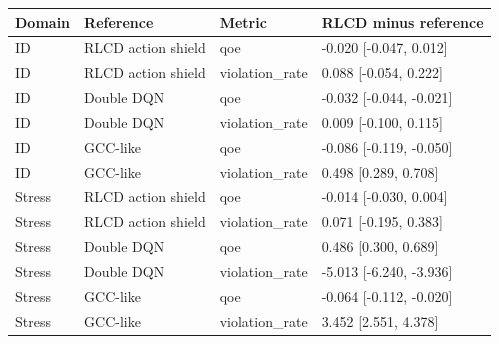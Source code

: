 \begin{tabular}{llll}
\toprule
Domain & Reference & Metric & RLCD minus reference \\
\midrule
ID & RLCD action shield & qoe & -0.020 [-0.047, 0.012] \\
ID & RLCD action shield & violation\_rate & 0.088 [-0.054, 0.222] \\
ID & Double DQN & qoe & -0.032 [-0.044, -0.021] \\
ID & Double DQN & violation\_rate & 0.009 [-0.100, 0.115] \\
ID & GCC-like & qoe & -0.086 [-0.119, -0.050] \\
ID & GCC-like & violation\_rate & 0.498 [0.289, 0.708] \\
Stress & RLCD action shield & qoe & -0.014 [-0.030, 0.004] \\
Stress & RLCD action shield & violation\_rate & 0.071 [-0.195, 0.383] \\
Stress & Double DQN & qoe & 0.486 [0.300, 0.689] \\
Stress & Double DQN & violation\_rate & -5.013 [-6.240, -3.936] \\
Stress & GCC-like & qoe & -0.064 [-0.112, -0.020] \\
Stress & GCC-like & violation\_rate & 3.452 [2.551, 4.378] \\
\bottomrule
\end{tabular}
